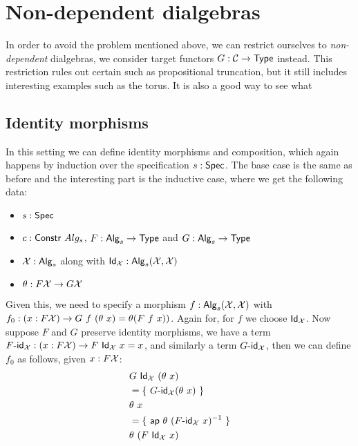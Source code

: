 \documentclass[a4paper,10pt]{report}
\begin{document}
\section{Non-dependent dialgebras}
\label{sec:nondepdialg}

In order to avoid the problem mentioned above, we can restrict
ourselves to \emph{non-dependent} dialgebras, \ie we consider target
functors $G : \mathcal{C} \to \mathsf{Type}$ instead. This restriction rules out
certain \hits such as propositional truncation, but it still includes
interesting examples such as the torus. It is also a good way to see
what 

\subsection{Identity morphisms}

In this setting we can define
identity morphisms and composition, which again happens by induction
over the specification $s : \mathsf{Spec}$. The base case is the same as
before and the interesting part is the inductive case, where we get
the following data:
%
\begin{itemize}
\item $s : \mathsf{Spec}$ 
\item $c : \mathsf{Constr}\ Alg_s$, \ie $F : \mathsf{Alg}_s \to \mathsf{Type}$ and $G : \mathsf{Alg}_s \to \mathsf{Type}$
\item $\mathcal{X} : \mathsf{Alg}_s$ along with
  $\mathsf{Id}_{\mathcal{X}} : \mathsf{Alg}_s (\mathcal{X},\mathcal{X})$
\item  $\theta : F \mathcal{X} \to G \mathcal{X}$
\end{itemize}
%
Given this, we need to specify a morphism
$f : \mathsf{Alg}_s (\mathcal{X},\mathcal{X})$ with
$f_0 : (x : F \mathcal{X}) \to G\ f\ (\theta\ x) = \theta (F\ f\ x))$.
Again for, for $f$ we choose $\mathsf{Id}_{\mathcal{X}}$. Now suppose $F$ and $G$
preserve identity morphisms, \ie we have a term
$\Fid_{\alg{X}} : (x : F \alg{X}) \to F\ \Id{\alg{X}}\ x = x$, and
similarly a term $G\mbox{-}\mathsf{id}_{\mathcal{X}}$, then we can define $f_0$ as
follows, given $x : F \mathcal{X}$:
%
\begin{align*}
  &G\ \mathsf{Id}_{\mathcal{X}}\ (\theta\ x) \\
  &= \{\ G\mbox{-}\mathsf{id}_{\mathcal{X}} (\theta\ x)\ \} \\
  &\theta\ x \\
  &= \{\ \mathsf{ap}\ \theta\ (F\mbox{-}\mathsf{id}_{\mathcal{X}}\ x)^{-1}\ \} \\
  &\theta\ (F\ \mathsf{Id}_{\mathcal{X}}\ x)
\end{align*}
%
\end{document}
